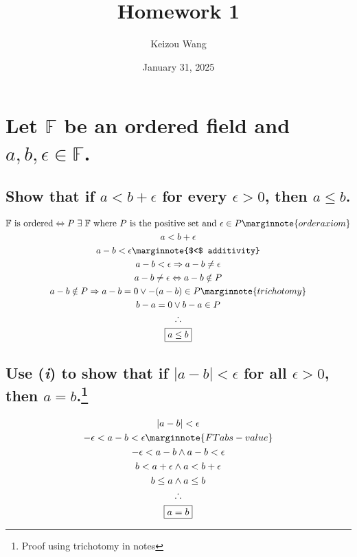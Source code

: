 \documentclass[letterpaper]{article}
\title{Homework 1}
\author{Keizou Wang}
\date{January 31, 2025}
\begin{document}
\maketitle

\section{Let $\mathbb{F}$ be an ordered field and $a, b, \epsilon \in \mathbb{F}$.}
\subsection{Show that if $a < b + \epsilon$ for every $\epsilon > 0$, then $a \leq b$.}
\begin{gather*}
\mathbb{F}
\text{ is ordered} \Leftrightarrow
P \hspace{3pt} \exists \hspace{3pt} \mathbb{F}
\text{ where $P$ is the positive set and } \epsilon \in P \marginnote{order axiom} \\
a<b+\epsilon \\
a-b<\epsilon \marginnote{$<$ additivity} \\
a-b<\epsilon \Rightarrow a-b\neq\epsilon \\
a-b\neq\epsilon \Leftrightarrow a-b\notin P \\
a-b\notin P \Rightarrow a-b=0 \lor -(a-b) \in P \marginnote{trichotomy} \\
b-a=0 \lor b-a \in P \\
\therefore \\
\boxed{a \leq b}
\end{gather*}
\subsection{Use (\textit{i}) to show that if $|a-b|<\epsilon$ for all $\epsilon>0$, then $a=b$.\protect\footnote{Proof using trichotomy in notes}}
\begin{gather*}
|a-b|<\epsilon \\
-\epsilon < a-b < \epsilon \marginnote{FT abs-value} \\
-\epsilon < a-b \land a-b < \epsilon \\
b<a+\epsilon \land a<b+\epsilon \\
b\leq a \land a\leq b \\
\therefore \\
\boxed{a = b}
\end{gather*}
\end{document}
